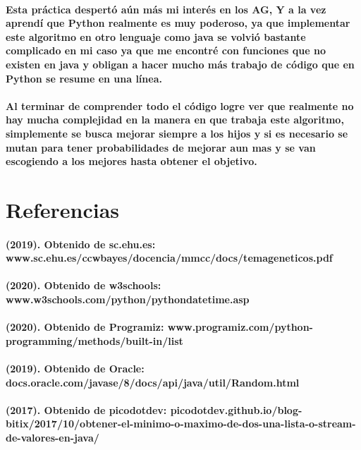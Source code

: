 \documentclass[10pt,a4paper]{article}
\begin{document}
\paragraph{
Esta pr\'actica despert\'o a\'un m\'as mi inter\'es en los AG, Y a la vez aprend\'i que Python realmente es muy poderoso, ya que implementar este algoritmo en otro lenguaje como java se volvi\'o bastante complicado en mi caso ya que me encontr\'e con funciones que no existen en java y obligan a hacer mucho m\'as trabajo de c\'odigo que en Python se resume en una l\'inea.}
\paragraph{
Al terminar de comprender todo el c\'odigo logre ver que realmente no hay mucha complejidad en la manera en que trabaja este algoritmo, simplemente se busca mejorar siempre a los hijos y si es necesario se mutan para tener probabilidades de mejorar aun mas y se van escogiendo a los mejores hasta obtener el objetivo. 
}
\section{Referencias}
\paragraph{(2019). Obtenido de sc.ehu.es: www.sc.ehu.es/ccwbayes/docencia/mmcc/docs/temageneticos.pdf}
\paragraph{(2020). Obtenido de w3schools: www.w3schools.com/python/pythondatetime.asp}
\paragraph{(2020). Obtenido de Programiz: www.programiz.com/python-programming/methods/built-in/list}
\paragraph{(2019). Obtenido de Oracle: docs.oracle.com/javase/8/docs/api/java/util/Random.html}
\paragraph{(2017). Obtenido de picodotdev: picodotdev.github.io/blog-bitix/2017/10/obtener-el-minimo-o-maximo-de-dos-una-lista-o-stream-de-valores-en-java/}
\end{document}
